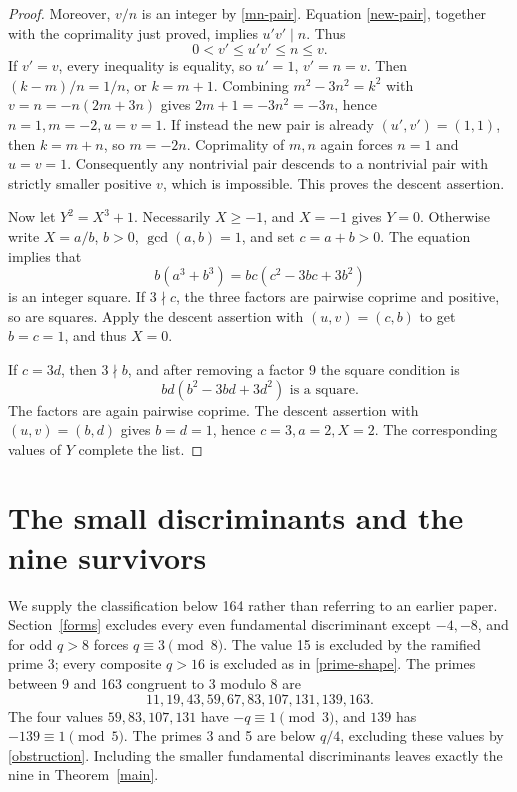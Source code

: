 \documentclass[11pt]{article}
\begin{document}
\begin{proof}
Moreover, \(v/n\) is an integer by \eqref{mn-pair}. Equation
\eqref{new-pair}, together with the coprimality just proved, implies
\(u'v'\mid n\). Thus
\[
 0<v'\le u'v'\le n\le v.
\]
If \(v'=v\), every inequality is equality, so
\(u'=1\), \(v'=n=v\). Then \((k-m)/n=1/n\), or
\(k=m+1\). Combining \(m^2-3n^2=k^2\) with
\(v=n=-n(2m+3n)\) gives
\(2m+1=-3n^2=-3n\), hence \(n=1,m=-2,u=v=1\).
If instead the new pair is already \((u',v')=(1,1)\), then
\(k=m+n\), so \(m=-2n\). Coprimality of \(m,n\) again
forces \(n=1\) and \(u=v=1\).
Consequently any nontrivial pair descends to a nontrivial pair with
strictly smaller positive \(v\), which is impossible. This proves
the descent assertion.

Now let \(Y^2=X^3+1\). Necessarily \(X\ge-1\), and
\(X=-1\) gives \(Y=0\). Otherwise write
\(X=a/b\), \(b>0\), \(\gcd(a,b)=1\), and set
\(c=a+b>0\). The equation implies that
\[
 b(a^3+b^3)=bc(c^2-3bc+3b^2)
\]
is an integer square. If \(3\nmid c\), the three factors are
pairwise coprime and positive, so are squares. Apply the descent
assertion with \((u,v)=(c,b)\) to get \(b=c=1\), and thus
\(X=0\).

If \(c=3d\), then \(3\nmid b\), and after removing a factor 9
the square condition is
\[
 bd(b^2-3bd+3d^2)\text{ is a square}.
\]
The factors are again pairwise coprime. The descent assertion with
\((u,v)=(b,d)\) gives \(b=d=1\), hence \(c=3,a=2,X=2\).
The corresponding values of \(Y\) complete the list.
\end{proof}

\section{The small discriminants and the nine survivors}\label{finite}

We supply the classification below 164 rather than referring to an
earlier paper. Section~\ref{forms} excludes every even fundamental
discriminant except \(-4,-8\), and for odd \(q>8\) forces
\(q\equiv3\pmod8\). The value 15 is excluded by the ramified
prime 3; every composite \(q>16\) is excluded as in
\eqref{prime-shape}. The primes between 9 and 163 congruent to 3
modulo 8 are
\[
 11,19,43,59,67,83,107,131,139,163.
\]
The four values \(59,83,107,131\) have \(-q\equiv1\pmod3\),
and \(139\) has \(-139\equiv1\pmod5\). The primes 3 and 5
are below \(q/4\), excluding these values by
\eqref{obstruction}. Including the smaller fundamental discriminants
leaves exactly the nine in Theorem~\ref{main}.
\end{document}
